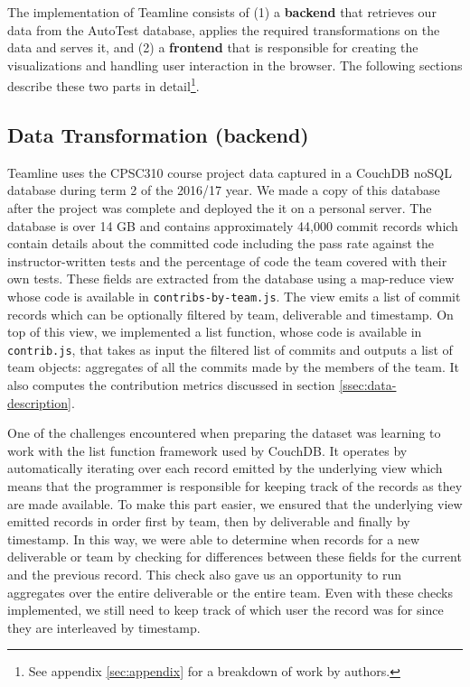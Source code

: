 \documentclass[../manifest.tex]{subfiles}
\begin{document}
The implementation of Teamline consists of (1) a \textbf{backend} that retrieves our data from the AutoTest database, applies the required transformations on the data and serves it, and (2) a \textbf{frontend} that is responsible for creating the visualizations and handling user interaction in the browser. The following sections describe these two parts in detail\footnote{See appendix \ref{sec:appendix} for a breakdown of work by authors.}.

\subsection{Data Transformation (backend)}
Teamline uses the CPSC310 course project data captured in a CouchDB noSQL database during term 2 of the 2016/17 year. We made a copy of this database after the project was complete and deployed the it on a personal server. The database is over 14 GB and contains approximately 44,000 commit records which contain details about the committed code including the pass rate against the instructor-written tests and the percentage of code the team covered with their own tests. These fields are extracted from the database using a map-reduce view whose code is available in \texttt{contribs-by-team.js}. The view emits a list of commit records which can be optionally filtered by team, deliverable and timestamp. On top of this view, we implemented a list function, whose code is available in \texttt{contrib.js}, that takes as input the filtered list of commits and outputs a list of team objects: aggregates of all the commits made by the members of the team. It also computes the contribution metrics discussed in section \ref{ssec:data-description}.

One of the challenges encountered when preparing the dataset was learning to work with the list function framework used by CouchDB. It operates by automatically iterating over each record emitted by the underlying view which means that the programmer is responsible for keeping track of the records as they are made available. To make this part easier, we ensured that the underlying view emitted records in order first by team, then by deliverable and finally by timestamp. In this way, we were able to determine when records for a new deliverable or team by checking for differences between these fields for the current and the previous record. This check also gave us an opportunity to run aggregates over the entire deliverable or the entire team. Even with these checks implemented, we still need to keep track of which user the record was for since they are interleaved by timestamp.
%
%
\end{document}
